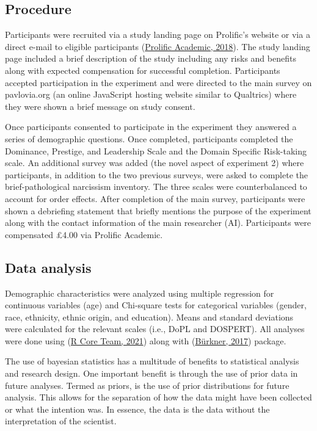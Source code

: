 \documentclass[
  donotrepeattitle,doc, 12pt, a4paper,floatsintext]{apa7}
\begin{document}
\hypertarget{procedure-2}{%
\subsection{Procedure}\label{procedure-2}}

Participants were recruited via a study landing page on Prolific's website or via a direct e-mail to eligible participants (\protect\hyperlink{ref-prolificacademic2018}{Prolific Academic, 2018}). The study landing page included a brief description of the study including any risks and benefits along with expected compensation for successful completion. Participants accepted participation in the experiment and were directed to the main survey on pavlovia.org (an online JavaScript hosting website similar to Qualtrics) where they were shown a brief message on study consent.

Once participants consented to participate in the experiment they answered a series of demographic questions. Once completed, participants completed the Dominance, Prestige, and Leadership Scale and the Domain Specific Risk-taking scale. An additional survey was added (the novel aspect of experiment 2) where participants, in addition to the two previous surveys, were asked to complete the brief-pathological narcissism inventory. The three scales were counterbalanced to account for order effects. After completion of the main survey, participants were shown a debriefing statement that briefly mentions the purpose of the experiment along with the contact information of the main researcher (AI). Participants were compensated £4.00 via Prolific Academic.

\hypertarget{data-analysis-2}{%
\subsection{Data analysis}\label{data-analysis-2}}

Demographic characteristics were analyzed using multiple regression for continuous variables (age) and Chi-square tests for categorical variables (gender, race, ethnicity, ethnic origin, and education). Means and standard deviations were calculated for the relevant scales (i.e., DoPL and DOSPERT). All analyses were done using (\protect\hyperlink{ref-rcoreteam2021}{R Core Team, 2021}) along with (\protect\hyperlink{ref-burkner2017}{Bürkner, 2017}) package.

The use of bayesian statistics has a multitude of benefits to statistical analysis and research design. One important benefit is through the use of prior data in future analyses. Termed as priors, is the use of prior distributions for future analysis. This allows for the separation of how the data might have been collected or what the intention was. In essence, the data is the data without the interpretation of the scientist.
\end{document}
